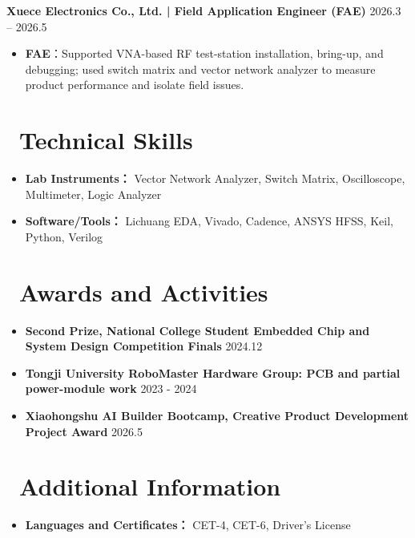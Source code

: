 \documentclass[11pt]{article}
\newlength{\interProjectSpacing}
\newcommand{\projectsep}{\vspace{\interProjectSpacing}}
\newlength{\intraProjectListTopSep}
\begin{document}

\textbf{Xuece Electronics Co., Ltd. | Field Application Engineer (FAE)} \hfill 2026.3 -- 2026.5 
\begin{itemize}[nosep, topsep=\intraProjectListTopSep]
    \item \textbf{FAE}：Supported VNA-based RF test-station installation, bring-up, and debugging; used switch matrix and vector network analyzer to measure product performance and isolate field issues.
\end{itemize}

\section{\makebox[\widthof{\faCogs}][c]{\color{CVBlue}\faCogs}\ Technical Skills}
\begin{itemize}[nosep]
    \item \textbf{Lab Instruments：} Vector Network Analyzer, Switch Matrix, Oscilloscope, Multimeter, Logic Analyzer
    \item \textbf{Software/Tools：} Lichuang EDA, Vivado, Cadence, ANSYS HFSS, Keil, Python,  Verilog
\end{itemize}

\section{\makebox[\widthof{\faGraduationCap}][c]{\color{CVBlue}\faList}\ Awards and Activities}
\begin{itemize}
    \item \textbf{Second Prize, National College Student Embedded Chip and System Design Competition Finals} \hfill 2024.12
    \item \textbf{Tongji University RoboMaster Hardware Group: PCB and partial power-module work} \hfill 2023 - 2024
    \item \textbf{Xiaohongshu AI Builder Bootcamp, Creative Product Development Project Award} \hfill 2026.5
\end{itemize}

\section{\makebox[\widthof{\faInfo}][c]{\color{CVBlue}\faInfo}\ Additional Information}
\begin{itemize}[parsep=0.5ex]
    \item \textbf{Languages and Certificates：} CET-4, CET-6, Driver’s License
\end{itemize}
\end{document}
